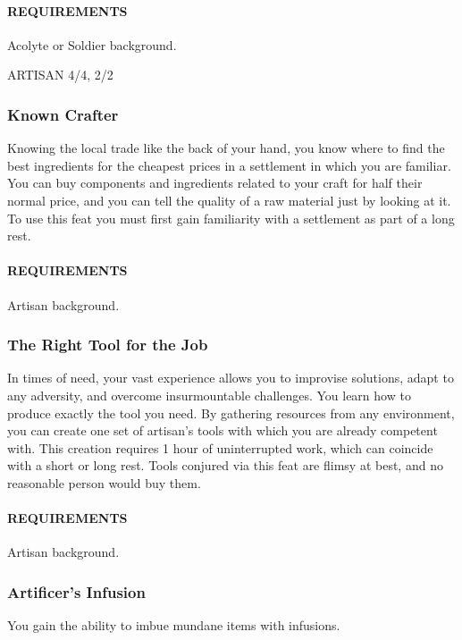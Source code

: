         \paragraph{REQUIREMENTS} Acolyte or Soldier background.

ARTISAN 4/4, 2/2
    \subsubsection{Known Crafter} \label{feat::knowncrafter}
        Knowing the local trade like the back of your hand, you know where to find the best ingredients for the cheapest prices in a settlement in which you are familiar.
        You can buy components and ingredients related to your craft for half their normal price, and you can tell the quality of a raw material just by looking at it.
        To use this feat you must first gain familiarity with a settlement as part of a long rest.
        \paragraph{REQUIREMENTS} Artisan background.

    \subsubsection{The Right Tool for the Job} \label{feat::therighttoolforthejob}
        In times of need, your vast experience allows you to improvise solutions, adapt to any adversity, and overcome insurmountable challenges.
        You learn how to produce exactly the tool you need.
        By gathering resources from any environment, you can create one set of artisan's tools with which you are already competent with.
        This creation requires 1 hour of uninterrupted work, which can coincide with a short or long rest.
        Tools conjured via this feat are flimsy at best, and no reasonable person would buy them.
        \paragraph{REQUIREMENTS} Artisan background.

    \subsubsection{Artificer's Infusion} \label{feat::artificersinfusion}
        You gain the ability to imbue mundane items with infusions.

